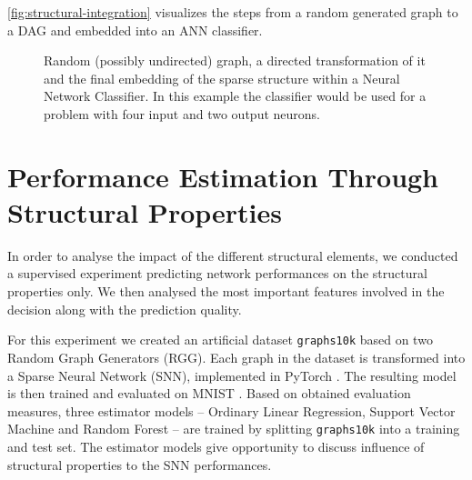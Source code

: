 \documentclass[runningheads]{llncs}
\newcommand{\imagePath}{./}
\begin{document}
\autoref{fig:structural-integration} visualizes the steps from a random generated graph to a DAG and embedded into an ANN classifier.

\begin{figure}[tb]
	\centering
	\hfill
	\hfill
	\caption{
		Random (possibly undirected) graph, a directed transformation of it and the final embedding of the sparse structure within a Neural Network Classifier.
		In this example the classifier would be used for a problem with four input and two output neurons.
	}
	\label{fig:structural-integration}
\end{figure}





\section{Performance Estimation Through Structural Properties}
In order to analyse the impact of the different structural elements, we conducted a supervised experiment predicting network performances on the structural properties only.
We then analysed the most important features involved in the decision along with the prediction quality.

For this experiment we created an artificial dataset \texttt{graphs10k} based on two Random Graph Generators (RGG).
Each graph in the dataset is transformed into a Sparse Neural Network (SNN), implemented in PyTorch \cite{paszke2017automatic}.
The resulting model is then trained and evaluated on MNIST \cite{lecun1998mnist}.
Based on obtained evaluation measures, three estimator models -- Ordinary Linear Regression, Support Vector Machine and Random Forest -- are trained by splitting \texttt{graphs10k} into a training and test set.
The estimator models give opportunity to discuss influence of structural properties to the SNN performances.
\end{document}
